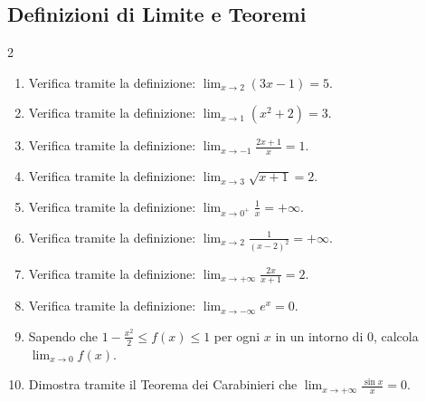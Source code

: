 \subsection{Definizioni di Limite e Teoremi}
\begin{multicols}{2}
\begin{enumerate}
    \item {} Verifica tramite la definizione: $\lim_{x \to 2} (3x - 1) = 5$.
    \item {} Verifica tramite la definizione: $\lim_{x \to 1} (x^2 + 2) = 3$.
    \item {} Verifica tramite la definizione: $\lim_{x \to -1} \frac{2x+1}{x} = 1$.
    \item {} Verifica tramite la definizione: $\lim_{x \to 3} \sqrt{x+1} = 2$.
    \item {} Verifica tramite la definizione: $\lim_{x \to 0^+} \frac{1}{x} = +\infty$.
    \item {} Verifica tramite la definizione: $\lim_{x \to 2} \frac{1}{(x-2)^2} = +\infty$.
    \item {} Verifica tramite la definizione: $\lim_{x \to +\infty} \frac{2x}{x+1} = 2$.
    \item {} Verifica tramite la definizione: $\lim_{x \to -\infty} e^x = 0$.
    \item {} Sapendo che $1-\frac{x^2}{2} \le f(x) \le 1$ per ogni $x$ in un intorno di $0$, calcola $\lim_{x \to 0} f(x)$.
    \item {} Dimostra tramite il Teorema dei Carabinieri che $\lim_{x \to +\infty} \frac{\sin x}{x} = 0$.
\end{enumerate}
\end{multicols}

